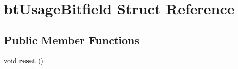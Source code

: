 \hypertarget{structbt_usage_bitfield}{\section{bt\+Usage\+Bitfield Struct Reference}
\label{structbt_usage_bitfield}
}
\subsection*{Public Member Functions}
\begin{DoxyCompactItemize}
\item 
\hypertarget{structbt_usage_bitfield_a887b34752e6e1a0e6af5e80ba0474a42}{void {\bfseries reset} ()}\label{structbt_usage_bitfield_a887b34752e6e1a0e6af5e80ba0474a42}

\end{DoxyCompactItemize}

